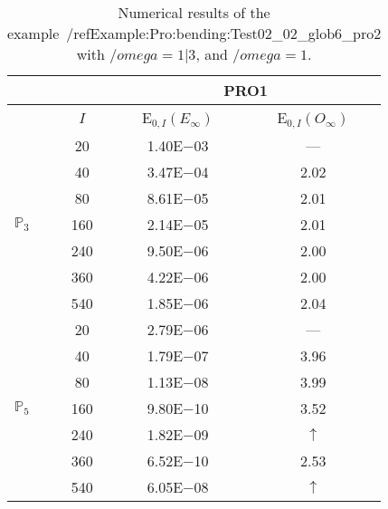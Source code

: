 \begin{table}[H]
\caption{Numerical results of the example~/ref{Example:Pro:bending:Test02_02_glob6_pro2} with $/omega=1|3$, and $/omega=1$.}
\setlength{\tabcolsep}{5pt}
\centering
\begin{tabular}{@{}l c c c@{}}
\toprule
 &  & \multicolumn{2}{c}{PRO1}\\
\midrule
 & $I$ & E$_{0,I}(E_{\infty})$ & E$_{0,I}(O_{\infty})$\\
\midrule
\multirow{7}{*}{$\mathbb{P}_{3}$}
 & 20 & 1.40E$-$03 & ---\\
 & 40 & 3.47E$-$04 & 2.02\\
 & 80 & 8.61E$-$05 & 2.01\\
 & 160 & 2.14E$-$05 & 2.01\\
 & 240 & 9.50E$-$06 & 2.00\\
 & 360 & 4.22E$-$06 & 2.00\\
 & 540 & 1.85E$-$06 & 2.04\\
\midrule
\multirow{7}{*}{$\mathbb{P}_{5}$}
 & 20 & 2.79E$-$06 & ---\\
 & 40 & 1.79E$-$07 & 3.96\\
 & 80 & 1.13E$-$08 & 3.99\\
 & 160 & 9.80E$-$10 & 3.52\\
 & 240 & 1.82E$-$09 & $\uparrow$\\
 & 360 & 6.52E$-$10 & 2.53\\
 & 540 & 6.05E$-$08 & $\uparrow$\\
\bottomrule
\end{tabular}
\label{Table:PRO:test_02_02_test22_pro2}
\end{table}
